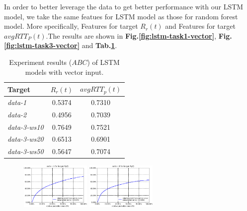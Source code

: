 \documentclass[sigconf]{acmart}
\begin{document}
	In order to better leverage the data to get better performance with our LSTM model, we take the same featues for LSTM model as those for random forest model. More specifically, Features for target $R_r(t)$ and Features for target $avgRTT_P(t)$.The results are shown in \textbf{Fig.\ref{fig:lstm-task1-vector}}, \textbf{Fig.\ref{fig:lstm-task3-vector}} and \textbf{Tab.\ref{tab:lstm-vector}}.
	\begin{table}[tbp]
		\centering
		\begin{tabular}{lcc}
			\toprule
			{Target} &{$R_r(t)$}&{$avgRTT_p(t)$} \\
			\midrule
			\textit{data-1}& 0.5374 & 0.7310 \\
			\textit{data-2}& 0.4956& 0.7039     \\
			\textit{data-3-ws10}& 0.7649 & 0.7521 \\
			\textit{data-3-ws20}& 0.6513& 0.6901    \\
			\textit{data-3-ws50}& 0.5647& 0.7074  \\
			\bottomrule	
		\end{tabular}
		\caption{ Experiment results ($ABC$) of LSTM models with vector input. }
		\label{tab:lstm-vector}
	\end{table}
	\begin{figure} 	
		\includegraphics[width=0.3\textwidth]{fig4/data-1-task-1-7030-lstm.pdf}
		\includegraphics[width=0.3\textwidth]{fig4/data-2-task-1-7030-lstm.pdf}
	\end{figure} 
\end{document}
